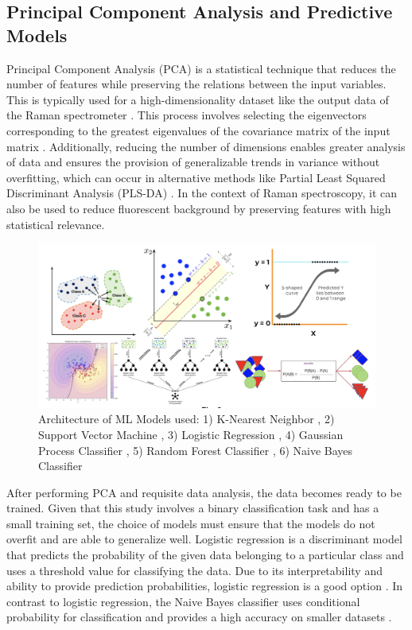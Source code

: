 \subsection{Principal Component Analysis and Predictive Models}

Principal Component Analysis (PCA) is a statistical technique that reduces the number of features while preserving the relations between the input variables. This is typically used for a high-dimensionality dataset like the output data of the Raman spectrometer \cite{Greenacre2022PCA}. This process involves selecting the eigenvectors corresponding to the greatest eigenvalues of the covariance matrix of the input matrix \cite{Shalizi2022Ch18}. Additionally, reducing the number of dimensions enables greater analysis of data and ensures the provision of generalizable trends in variance without overfitting, which can occur in alternative methods like Partial Least Squared Discriminant Analysis (PLS-DA) \cite{Woodgate2016RSTA}. In the context of Raman spectroscopy, it can also be used to reduce fluorescent background by preserving features with high statistical relevance. \\ 

\begin{figure}
    \centering
    \includegraphics[width=0.8\linewidth]{Figures/Model_Architecture.png}
    \caption{Architecture of ML Models used: 1) K-Nearest Neighbor \cite{imageknn}, 2) Support Vector Machine \cite{Singh2025_SupervisedLearningCheatSheet}, 3) Logistic Regression \cite{DataLensBlogger2024_ClassificationCheatSheet} , 4) Gaussian Process Classifier \cite{Kulkarni2024_Day10SLA3} , 5) Random Forest Classifier \cite{ranforest} , 6) Naive Bayes Classifier \cite{MLArchive_NaiveBayes2023} }
    \label{fig:model-architecture}
\end{figure}


\noindent After performing PCA and requisite data analysis, the data becomes ready to be trained. Given that this study involves a binary classification task and has a small training set, the choice of models must ensure that the models do not overfit and are able to generalize well. Logistic regression is a discriminant model that predicts the probability of the given data belonging to a particular class and uses a threshold value for classifying the data. Due to its interpretability and ability to provide prediction probabilities, logistic regression is a good option \cite{JurafskySLP3_Ch5}. In contrast to logistic regression, the Naive Bayes classifier uses conditional probability for classification and provides a high accuracy on smaller datasets \cite{Anonymous2012NaiveBayesRG}. \\

